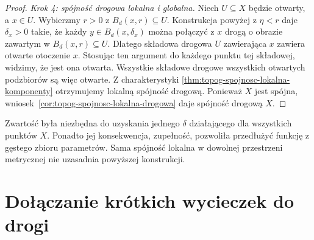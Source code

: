 \begin{proof}
\emph{Krok 4: spójność drogowa lokalna i globalna.}
Niech \(U\subseteq X\) będzie otwarty,
a \(x\in U\).
Wybierzmy \(r>0\)
z \(B_d(x,r)\subseteq U\).
Konstrukcja powyżej z \(\eta<r\)
daje \(\delta_x>0\) takie, że
każdy \(y\in B_d(x,\delta_x)\)
można połączyć z \(x\)
drogą o obrazie zawartym
w \(B_d(x,r)\subseteq U\).
Dlatego składowa drogowa
\(U\) zawierająca \(x\)
zawiera otwarte otoczenie \(x\).
Stosując ten argument do
każdego punktu tej składowej,
widzimy, że jest ona otwarta.
Wszystkie składowe drogowe
wszystkich otwartych podzbiorów
są więc otwarte.
Z charakterystyki
\ref{thm:topog-spojnosc-lokalna-komponenty}
otrzymujemy lokalną spójność drogową.
Ponieważ \(X\) jest spójna,
wniosek~\ref{cor:topog-spojnosc-lokalna-drogowa}
daje spójność drogową \(X\).
\end{proof}

\begin{uwaga}
\label{rem:topog26-compactness}
Zwartość była niezbędna do uzyskania
jednego \(\delta\) działającego
dla wszystkich punktów \(X\).
Ponadto jej konsekwencja, zupełność,
pozwoliła przedłużyć funkcję
z gęstego zbioru parametrów.
Sama spójność lokalna w dowolnej
przestrzeni metrycznej nie uzasadnia
powyższej konstrukcji.
\end{uwaga}

\section{Dołączanie krótkich wycieczek do drogi}
\label{sec:topog26-excursions}

